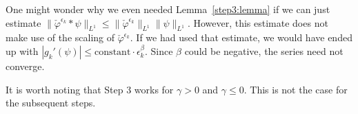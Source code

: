 \begin{remark}
One might wonder why we even needed Lemma~\ref{step3:lemma} if we can just estimate \(\lVert \check \varphi^{\epsilon_k} * \psi \rVert_{L^1} \leq \lVert \check \varphi^{\epsilon_k} \rVert_{L^1} \lVert \psi \rVert_{L^1}\). However, this estimate does not make use of the scaling of \(\check \varphi^{\epsilon_k}\). If we had used that estimate, we would have ended up with \(|g_k'(\psi)| \leq \mathrm{constant} \cdot \epsilon_k^{\beta}\). Since \(\beta\) could be negative, the series need not converge.
\end{remark}

It is worth noting that Step 3 works for \(\gamma > 0\) and \(\gamma \leq 0\). This is not the case for the subsequent steps.  
